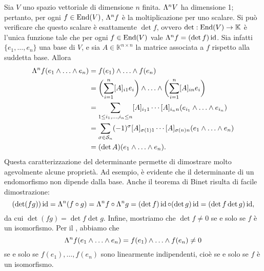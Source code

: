 \begin{example}
Sia $V$ uno spazio vettoriale di dimensione $n$ finita. $\Lambda^nV$ ha dimensione 1; pertanto, per ogni $f\in\operatorname{End}(V)$, $\Lambda^nf$ è la moltiplicazione per uno scalare. Si può verificare che questo scalare è esattamente $\det f$, ovvero $\det:\operatorname{End}(V)\to\mathbb{K}$ è l'unica funzione tale che per ogni $f\in\operatorname{End}(V)$ vale $\Lambda^nf=(\det f)\operatorname{id}$. Sia infatti $\{e_1,\ldots,e_n\}$ una base di $V$, e sia $A\in\mathbb{K}^{n\times n}$ la matrice associata a $f$ rispetto alla suddetta base. Allora
\begin{align*}
\Lambda^nf(e_1\wedge\ldots\wedge e_n)&=f(e_1)\wedge\ldots\wedge f(e_n)\\
&=\biggl(\sum_{i=1}^{n}[A]_{i1}e_i\biggr)\wedge\ldots\wedge\biggl(\sum_{i=1}^{n}[A]_{in}e_i\biggr)\\
&=\sum_{1\le i_1,\ldots,i_n\le n}[A]_{i_11}\cdots[A]_{i_nn}(e_{i_1}\wedge\ldots\wedge e_{i_n})\\
&=\sum_{\sigma\in\mathcal{S}_n}(-1)^\sigma[A]_{\sigma(1)1}\cdots[A]_{\sigma(n)n}(e_1\wedge\ldots\wedge e_n)\\
&=(\det A)(e_1\wedge\ldots\wedge e_n).
\end{align*}
Questa caratterizzazione del determinante permette di dimostrare molto agevolmente alcune proprietà. Ad esempio, è evidente che il determinante di un endomorfismo non dipende dalla base. Anche il teorema di Binet risulta di facile dimostrazione:
$$
(\det(fg))\operatorname{id}=\Lambda^n(f\circ g)=\Lambda^nf\circ\Lambda^ng=(\det f)\operatorname{id}\circ(\det g)\operatorname{id}=(\det f\det g)\operatorname{id},
$$
da cui $\det(fg)=\det f\det g$. Infine, mostriamo che $\det f\neq 0$ se e solo se $f$ è un isomorfismo. Per il , abbiamo che 
$$
\Lambda^nf(e_1\wedge\ldots\wedge e_n)=f(e_1)\wedge\ldots\wedge f(e_n)\neq0
$$
se e solo se $f(e_1),\ldots,f(e_n)$ sono linearmente indipendenti, cioè se e solo se $f$ è un isomorfismo. 
\end{example}

